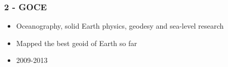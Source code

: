 \documentclass[aspectratio=169]{beamer}
\begin{document}
{
\begin{frame}[plain]
\end{frame}}


\begin{frame}
  \frametitle{2 - GOCE}
\begin{center}
\begin{itemize}
 \item Oceanography, solid Earth physics, geodesy and sea-level research
 \item Mapped the best geoid of Earth so far
 \item 2009-2013
\end{itemize}
\end{center}
\end{frame}

\end{document}
